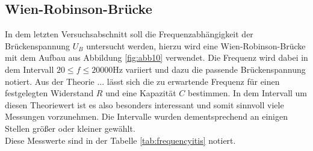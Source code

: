 \subsection{Wien-Robinson-Brücke}
In dem letzten Versuchsabschnitt soll die Frequenzabhängigkeit der Brückenspannung $U_{B}$ untersucht werden, hierzu wird eine Wien-Robinson-Brücke mit dem Aufbau aus 
Abbildung \ref{fig:abb10} verwendet. Die Frequenz wird dabei in dem Intervall $20 \leq f \leq 20000 \si{\hertz}$ variiert und dazu die passende Brückenspannung notiert. Aus der Theorie ...
lässt sich die zu erwartende Frequenz für einen festgelegten Widerstand $R$ und eine Kapazität $C$ bestimmen. In dem Intervall um diesen Theoriewert ist es also besonders interessant und somit sinnvoll viele Messungen vorzunehmen.
Die Intervalle wurden dementsprechend an einigen Stellen größer oder kleiner gewählt. 
\\
\newline
Diese Messwerte sind in der Tabelle \ref{tab:frequencyitis} notiert.

